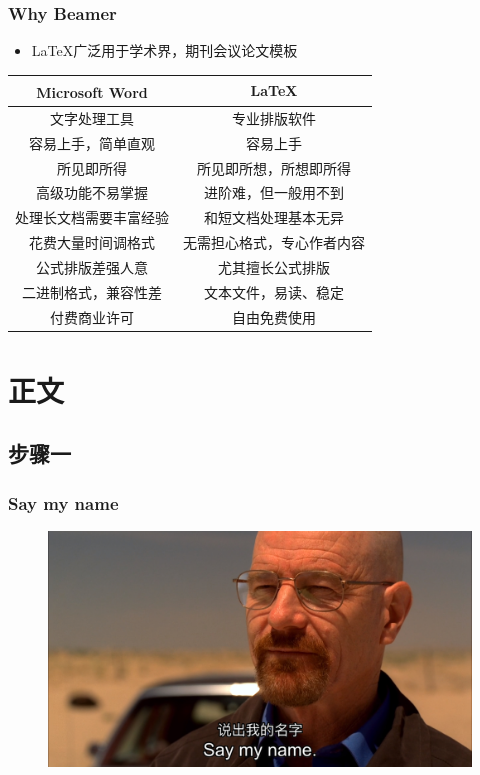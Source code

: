 \documentclass[AutoFakeBold,AutoFakeSlant]{beamer}
\begin{document}
\begin{frame}
  \frametitle{Why Beamer}
	\begin{itemize}
		\item \LaTeX 广泛用于学术界，期刊会议论文模板
	\end{itemize}
	\begin{table}[h]
		\centering
		\begin{tabular}{c|c}
			Microsoft\textsuperscript{\textregistered}  Word & \LaTeX \\
			\hline
			文字处理工具 & 专业排版软件 \\
			容易上手，简单直观 & 容易上手 \\
			所见即所得 & 所见即所想，所想即所得 \\
			高级功能不易掌握 & 进阶难，但一般用不到 \\
			处理长文档需要丰富经验 & 和短文档处理基本无异 \\
			花费大量时间调格式 & 无需担心格式，专心作者内容 \\
			公式排版差强人意 & 尤其擅长公式排版 \\
			二进制格式，兼容性差 & 文本文件，易读、稳定 \\
			付费商业许可 & 自由免费使用 \\
		\end{tabular}
	\end{table}
\end{frame}


\section{正文}

\subsection{步骤一}

\begin{frame}
  \frametitle{Say my name}
 \begin{figure}[H]
 	\centering
 	\includegraphics[width=0.7\linewidth]{figures/say_my_name}
 	\label{fig:saymyname}
 \end{figure}
 
\end{frame}
\end{document}
